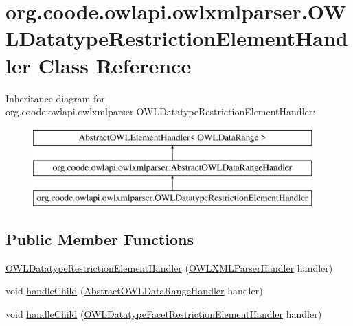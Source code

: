 \hypertarget{classorg_1_1coode_1_1owlapi_1_1owlxmlparser_1_1_o_w_l_datatype_restriction_element_handler}{\section{org.\-coode.\-owlapi.\-owlxmlparser.\-O\-W\-L\-Datatype\-Restriction\-Element\-Handler Class Reference}
\label{classorg_1_1coode_1_1owlapi_1_1owlxmlparser_1_1_o_w_l_datatype_restriction_element_handler}
}
Inheritance diagram for org.\-coode.\-owlapi.\-owlxmlparser.\-O\-W\-L\-Datatype\-Restriction\-Element\-Handler\-:\begin{figure}[H]
\begin{center}
\leavevmode
\includegraphics[height=3.000000cm]{classorg_1_1coode_1_1owlapi_1_1owlxmlparser_1_1_o_w_l_datatype_restriction_element_handler}
\end{center}
\end{figure}
\subsection*{Public Member Functions}
\begin{DoxyCompactItemize}
\item 
\hyperlink{classorg_1_1coode_1_1owlapi_1_1owlxmlparser_1_1_o_w_l_datatype_restriction_element_handler_abe0bd207039139cf4031497550455219}{O\-W\-L\-Datatype\-Restriction\-Element\-Handler} (\hyperlink{classorg_1_1coode_1_1owlapi_1_1owlxmlparser_1_1_o_w_l_x_m_l_parser_handler}{O\-W\-L\-X\-M\-L\-Parser\-Handler} handler)
\item 
void \hyperlink{classorg_1_1coode_1_1owlapi_1_1owlxmlparser_1_1_o_w_l_datatype_restriction_element_handler_af797f7bafbaafd964aa637c028319106}{handle\-Child} (\hyperlink{classorg_1_1coode_1_1owlapi_1_1owlxmlparser_1_1_abstract_o_w_l_data_range_handler}{Abstract\-O\-W\-L\-Data\-Range\-Handler} handler)
\item 
void \hyperlink{classorg_1_1coode_1_1owlapi_1_1owlxmlparser_1_1_o_w_l_datatype_restriction_element_handler_a0cedf6dc089cb34fe6aa60334f4ba9c1}{handle\-Child} (\hyperlink{classorg_1_1coode_1_1owlapi_1_1owlxmlparser_1_1_o_w_l_datatype_facet_restriction_element_handler}{O\-W\-L\-Datatype\-Facet\-Restriction\-Element\-Handler} handler)
\end{DoxyCompactItemize}
